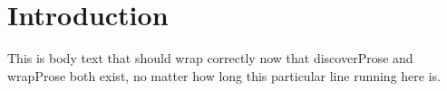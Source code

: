 \section{Introduction}

This is body text that should wrap correctly now that discoverProse and wrapProse both exist, no matter how long this particular line running here is.

